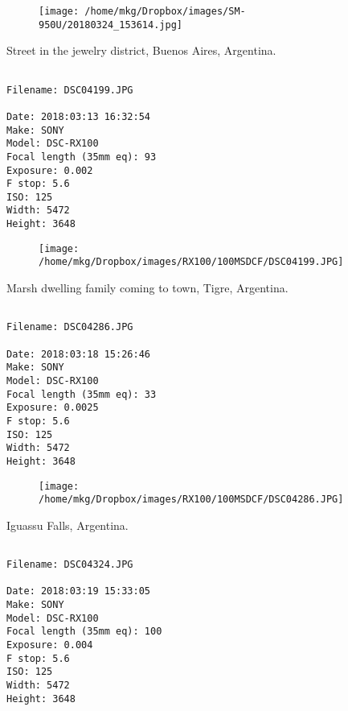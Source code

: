 \begin{figure}
\texttt{[image: /home/mkg/Dropbox/images/SM-950U/20180324\_153614.jpg]}
\end{figure}
    
\clearpage
\onecolumn
\noindent Street in the jewelry district, Buenos Aires, Argentina.
\noindent
\begin{lstlisting}

Filename: DSC04199.JPG

Date: 2018:03:13 16:32:54
Make: SONY
Model: DSC-RX100
Focal length (35mm eq): 93
Exposure: 0.002
F stop: 5.6
ISO: 125
Width: 5472
Height: 3648
\end{lstlisting}
\clearpage

\begin{figure}
\texttt{[image: /home/mkg/Dropbox/images/RX100/100MSDCF/DSC04199.JPG]}
\end{figure}
    
\clearpage
\onecolumn
\noindent Marsh dwelling family coming to town, Tigre, Argentina.
\noindent
\begin{lstlisting}

Filename: DSC04286.JPG

Date: 2018:03:18 15:26:46
Make: SONY
Model: DSC-RX100
Focal length (35mm eq): 33
Exposure: 0.0025
F stop: 5.6
ISO: 125
Width: 5472
Height: 3648
\end{lstlisting}
\clearpage

\begin{figure}
\texttt{[image: /home/mkg/Dropbox/images/RX100/100MSDCF/DSC04286.JPG]}
\end{figure}
    
\clearpage
\onecolumn
\noindent Iguassu Falls, Argentina.
\noindent
\begin{lstlisting}

Filename: DSC04324.JPG

Date: 2018:03:19 15:33:05
Make: SONY
Model: DSC-RX100
Focal length (35mm eq): 100
Exposure: 0.004
F stop: 5.6
ISO: 125
Width: 5472
Height: 3648
\end{lstlisting}
\clearpage

